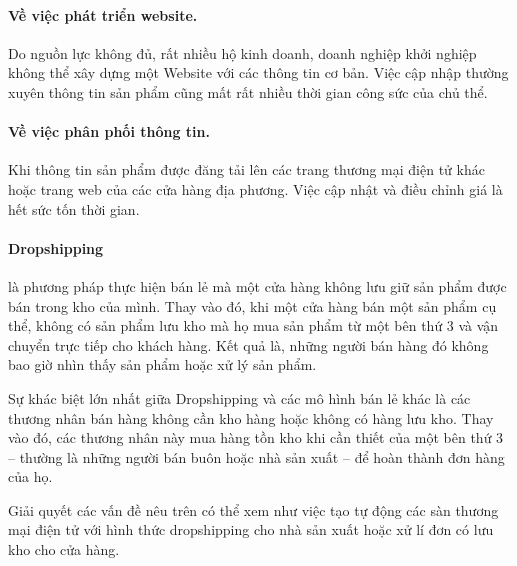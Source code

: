 \documentclass[11pt]{report}
\begin{document}
\paragraph{Về việc phát triển website.}\label{pro:1} Do nguồn lực không đủ, rất nhiều hộ kinh doanh, doanh nghiệp khởi nghiệp không thể xây dựng một Website với các thông tin cơ bản. Việc cập nhập thường xuyên thông tin sản phẩm cũng mất rất nhiều thời gian công sức của chủ thể.

\paragraph{Về việc phân phối thông tin.}\label{pro:2} Khi thông tin sản phẩm được đăng tải  lên các trang thương mại điện tử khác hoặc trang web của các cửa hàng địa phương. Việc cập nhật và điều chỉnh giá là hết sức tốn thời gian.

\paragraph{Dropshipping} là phương pháp thực hiện bán lẻ mà một cửa hàng không lưu giữ sản phẩm được bán trong kho của mình. Thay vào đó, khi một cửa hàng bán một sản phẩm cụ thể, không có sản phẩm lưu kho mà họ mua sản phẩm từ một bên thứ 3 và vận chuyển trực tiếp cho khách hàng. Kết quả là, những người bán hàng đó không bao giờ nhìn thấy sản phẩm hoặc xử lý sản phẩm.

Sự khác biệt lớn nhất giữa Dropshipping và các mô hình bán lẻ khác là các thương nhân bán hàng không cần kho hàng hoặc không có hàng lưu kho. Thay vào đó, các thương nhân này mua hàng tồn kho khi cần thiết của một bên thứ 3 – thường là những người bán buôn hoặc nhà sản xuất – để hoàn thành đơn hàng của họ.

Giải quyết các vấn đề nêu trên có thể xem như việc tạo tự động các sàn thương mại điện tử với hình thức dropshipping cho nhà sản xuất hoặc xử lí đơn có lưu kho cho cửa hàng.

%
\end{document}

